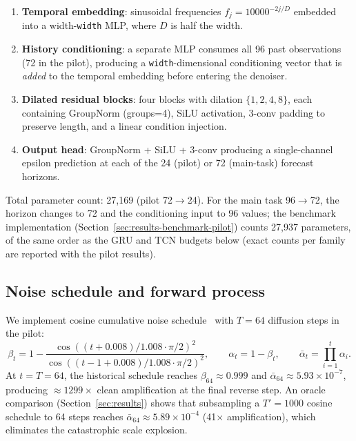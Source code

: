 \begin{enumerate}
    \item \textbf{Temporal embedding}: sinusoidal frequencies $f_j = 10000^{-2j/D}$
    embedded into a width-\texttt{width} MLP, where $D$ is half the width.

    \item \textbf{History conditioning}: a separate MLP consumes all 96 past
    observations (72 in the pilot), producing a \texttt{width}-dimensional
    conditioning vector that is \emph{added} to the temporal embedding before
    entering the denoiser.

    \item \textbf{Dilated residual blocks}: four blocks with dilation $\{1, 2, 4, 8\}$,
    each containing GroupNorm (groups=4), SiLU activation, 3-conv padding to
    preserve length, and a linear condition injection.

    \item \textbf{Output head}: GroupNorm + SiLU + 3-conv producing a single-channel
    epsilon prediction at each of the 24 (pilot) or 72 (main-task) forecast horizons.
\end{enumerate}

Total parameter count: 27,169 (pilot 72$\rightarrow$24). For the main task 96$\rightarrow$72,
the horizon changes to 72 and the conditioning input to 96 values; the
benchmark implementation (Section~\ref{sec:results-benchmark-pilot}) counts
27{,}937 parameters, of the same order as the GRU and TCN budgets below
(exact counts per family are reported with the pilot results).

\subsection{Noise schedule and forward process}
We implement cosine cumulative noise schedule~\citep{ho2020denoising} with
$T=64$ diffusion steps in the pilot:
\begin{equation}
    \beta_t = 1 - \frac{\cos((t+0.008)/1.008 \cdot \pi/2)^2}{\cos((t-1+0.008)/1.008 \cdot \pi/2)^2},
    \qquad \alpha_t = 1 - \beta_t, \qquad \bar{\alpha}_t = \prod_{i=1}^{t} \alpha_i.
\end{equation}
At $t=T=64$, the historical schedule reaches $\beta_{64} \approx 0.999$ and
$\bar{\alpha}_{64} \approx 5.93 \times 10^{-7}$, producing $\approx 1299\times$
clean amplification at the final reverse step. An oracle comparison (Section~\ref{sec:results})
shows that subsampling a $T'=1000$ cosine schedule to 64 steps reaches
$\bar{\alpha}_{64} \approx 5.89 \times 10^{-4}$ (41$\times$ amplification),
which eliminates the catastrophic scale explosion.

